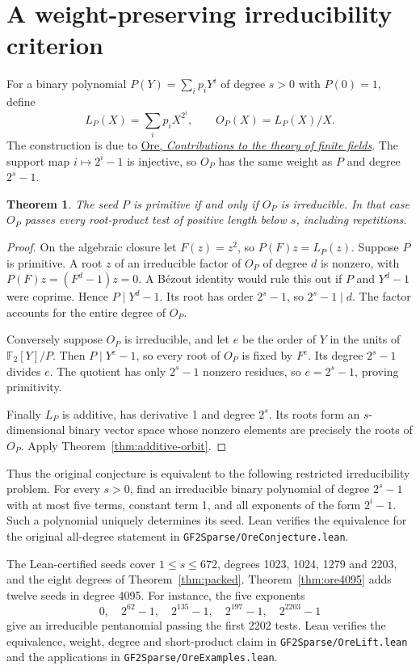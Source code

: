 \documentclass[11pt]{article}
\newtheorem{theorem}{Theorem}
\newcommand{\F}{\mathbb F_2}
\begin{document}
\section{A weight-preserving irreducibility criterion}
For a binary polynomial \(P(Y)=\sum_i p_iY^i\) of degree \(s>0\) with
\(P(0)=1\), define
\[
       L_P(X)=\sum_i p_iX^{2^i},\qquad O_P(X)=L_P(X)/X.
\]
The construction is due to
\href{https://doi.org/10.1090/S0002-9947-1934-1501740-7}{Ore,
\emph{Contributions to the theory of finite fields}}.
The support map \(i\mapsto 2^i-1\) is injective, so \(O_P\) has the
same weight as \(P\) and degree \(2^s-1\).

\begin{theorem}\label{thm:ore-equivalence}
The seed \(P\) is primitive if and only if \(O_P\) is irreducible.
In that case \(O_P\) passes every root-product test of positive
length below \(s\), including repetitions.
\end{theorem}
\begin{proof}
On the algebraic closure let \(F(z)=z^2\), so \(P(F)z=L_P(z)\).
Suppose \(P\) is primitive. A root \(z\) of an irreducible factor
of \(O_P\) of degree \(d\) is nonzero, with
\(P(F)z=(F^d-1)z=0\). A B\'ezout identity would rule this out if
\(P\) and \(Y^d-1\) were coprime. Hence \(P\mid Y^d-1\). Its root
has order \(2^s-1\), so \(2^s-1\mid d\). The factor accounts for
the entire degree of \(O_P\).

Conversely suppose \(O_P\) is irreducible, and let \(e\) be the
order of \(Y\) in the units of \(\F[Y]/P\). Then \(P\mid Y^e-1\),
so every root of \(O_P\) is fixed by \(F^e\). Its degree \(2^s-1\)
divides \(e\). The quotient has only \(2^s-1\) nonzero residues,
so \(e=2^s-1\), proving primitivity.

Finally \(L_P\) is additive, has derivative 1 and degree \(2^s\).
Its roots form an \(s\)-dimensional binary vector space whose
nonzero elements are precisely the roots of \(O_P\).
Apply Theorem~\ref{thm:additive-orbit}.
\end{proof}

Thus the original conjecture is equivalent to the following restricted
irreducibility problem. For every \(s>0\), find an irreducible
binary polynomial of degree \(2^s-1\) with at most five terms,
constant term 1, and all exponents of the form \(2^i-1\).
Such a polynomial uniquely determines its seed. Lean verifies the
equivalence for the original all-degree statement in
\nolinkurl{GF2Sparse/OreConjecture.lean}.

The Lean-certified seeds cover \(1\le s\le672\), degrees
1023, 1024, 1279 and 2203, and the eight degrees of Theorem~\ref{thm:packed}. Theorem~\ref{thm:ore4095} adds twelve
seeds in degree 4095. For instance, the five exponents
\[
    0,\quad 2^{62}-1,\quad 2^{135}-1,\quad 2^{197}-1,\quad 2^{2203}-1
\]
give an irreducible pentanomial passing the first 2202 tests.
Lean verifies the equivalence, weight, degree and short-product
claim in \nolinkurl{GF2Sparse/OreLift.lean} and the applications
in \nolinkurl{GF2Sparse/OreExamples.lean}.
\end{document}

